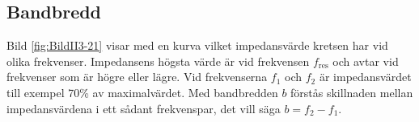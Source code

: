 \subsection{Bandbredd}

Bild \ref{fig:BildII3-21} visar med en kurva vilket impedansvärde kretsen har
vid olika frekvenser.
Impedansens högsta värde är vid frekvensen \(f_{\text{res}}\) och avtar vid 
frekvenser som är högre eller lägre.
Vid frekvenserna \(f_1\) och \(f_2\) är impedansvärdet till exempel 70\% av
maximalvärdet.
Med bandbredden \(b\) förstås skillnaden mellan impedansvärdena i ett sådant
frekvenspar, det vill säga \(b = f_2 - f_1\).
